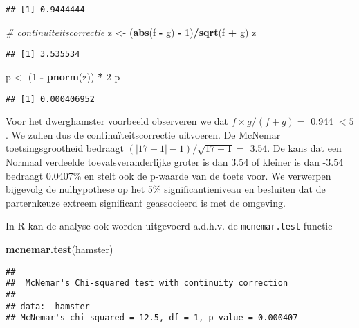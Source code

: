 \documentclass[
  12pt,dutch,coursenotes]{book}
\newenvironment{Shaded}{\begin{snugshade}}{\end{snugshade}}
\newcommand{\CommentTok}[1]{\textcolor[rgb]{0.56,0.35,0.01}{\textit{#1}}}
\newcommand{\DecValTok}[1]{\textcolor[rgb]{0.00,0.00,0.81}{#1}}
\newcommand{\KeywordTok}[1]{\textcolor[rgb]{0.13,0.29,0.53}{\textbf{#1}}}
\newcommand{\NormalTok}[1]{#1}
\newcommand{\OperatorTok}[1]{\textcolor[rgb]{0.81,0.36,0.00}{\textbf{#1}}}
\newcommand{\StringTok}[1]{\textcolor[rgb]{0.31,0.60,0.02}{#1}}
\theoremstyle{definition}
\theoremstyle{definition}
\theoremstyle{definition}
\theoremstyle{remark}
\begin{document}
\begin{verbatim}
## [1] 0.9444444
\end{verbatim}

\begin{Shaded}
\begin{Highlighting}[]
\CommentTok{\# continuiteitscorrectie}
\NormalTok{z \textless{}{-}}\StringTok{ }\NormalTok{(}\KeywordTok{abs}\NormalTok{(f }\OperatorTok{{-}}\StringTok{ }\NormalTok{g) }\OperatorTok{{-}}\StringTok{ }\DecValTok{1}\NormalTok{)}\OperatorTok{/}\KeywordTok{sqrt}\NormalTok{(f }\OperatorTok{+}\StringTok{ }\NormalTok{g)}
\NormalTok{z}
\end{Highlighting}
\end{Shaded}

\begin{verbatim}
## [1] 3.535534
\end{verbatim}

\begin{Shaded}
\begin{Highlighting}[]
\NormalTok{p \textless{}{-}}\StringTok{ }\NormalTok{(}\DecValTok{1} \OperatorTok{{-}}\StringTok{ }\KeywordTok{pnorm}\NormalTok{(z)) }\OperatorTok{*}\StringTok{ }\DecValTok{2}
\NormalTok{p}
\end{Highlighting}
\end{Shaded}

\begin{verbatim}
## [1] 0.000406952
\end{verbatim}

Voor het dwerghamster voorbeeld observeren we dat
\(f\times g/(f+g)=\) 0.944 \(<5\).
We zullen dus de continuïteitscorrectie uitvoeren.
De McNemar toetsingsgrootheid bedraagt
\((\vert 17-1 \vert -1)/\sqrt{17+1}=\) 3.54.
De kans dat een Normaal verdeelde toevalsveranderlijke groter is
dan 3.54 of kleiner is dan -3.54 bedraagt 0.0407\% en stelt ook de p-waarde van
de toets voor. We verwerpen bijgevolg de nulhypothese op het 5\% significantieniveau en
besluiten dat de parternkeuze extreem significant geassocieerd is met de omgeving.

In R kan de analyse ook worden uitgevoerd a.d.h.v. de \texttt{mcnemar.test} functie

\begin{Shaded}
\begin{Highlighting}[]
\KeywordTok{mcnemar.test}\NormalTok{(hamster)}
\end{Highlighting}
\end{Shaded}

\begin{verbatim}
## 
##  McNemar's Chi-squared test with continuity correction
## 
## data:  hamster
## McNemar's chi-squared = 12.5, df = 1, p-value = 0.000407
\end{verbatim}
\end{document}
